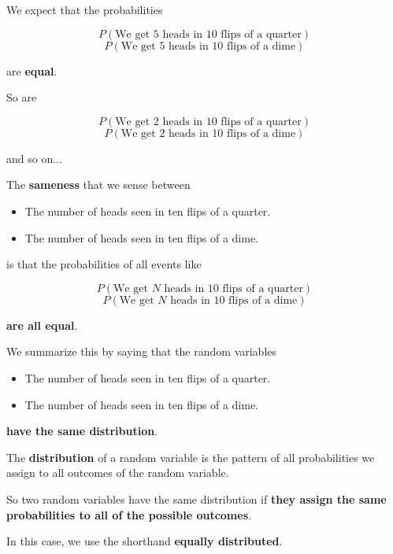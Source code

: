%
\begin{frame}

We expect that the probabilities

$$ P(\text{We get 5 heads in 10 flips of a quarter}) $$
$$ P(\text{We get 5 heads in 10 flips of a dime}) $$

are \textbf{equal}.

\hfill

So are

$$ P(\text{We get 2 heads in 10 flips of a quarter}) $$
$$ P(\text{We get 2 heads in 10 flips of a dime}) $$

and so on...
\end{frame}
%

%
\begin{frame}
The \textbf{sameness} that we sense between

\begin{itemize}
\item The number of heads seen in ten flips of a quarter.
\item The number of heads seen in ten flips of a dime.
\end{itemize}

is that the probabilities of all events like

$$ P(\text{We get } N \text{ heads in 10 flips of a quarter}) $$
$$ P(\text{We get } N \text{ heads in 10 flips of a dime}) $$

\textbf{are all equal}.
\end{frame}
%

%
\begin{frame}
We summarize this by saying that the random variables


\begin{itemize}
\item The number of heads seen in ten flips of a quarter.
\item The number of heads seen in ten flips of a dime.
\end{itemize}

\textbf{have the same distribution}.

\hfill

The \textbf{distribution} of a random variable is the pattern of all
probabilities we assign to all outcomes of the random variable.
\end{frame}

%
\begin{frame}
So two random variables have the same distribution if \textbf{they assign the
same probabilities to all of the possible outcomes}.

\hfill

In this case, we use the shorthand \textbf{equally distributed}.
\end{frame}
%
